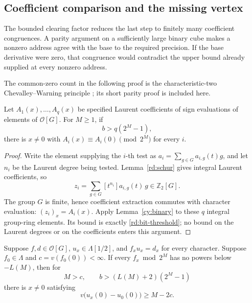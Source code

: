\subsection{Coefficient comparison and the missing vertex}
\label{rd:transfer-subsection}

The bounded clearing factor reduces the last step to finitely many
coefficient congruences.  A parity argument on a sufficiently large
binary cube makes a nonzero address agree with the base to the required
precision.  If the base derivative were zero, that congruence would
contradict the upper bound already supplied at every nonzero address.

The common-zero count in the following proof is the characteristic-two
Chevalley--Warning principle
\cite[Section~1, equation~(1)]{HeathBrownChevalleyWarning}; its short parity
proof is included here.

\begin{lemma}
\label{rd:bits}
Let \(A_1(x),\ldots,A_q(x)\) be specified Laurent
coefficients of sign evaluations of elements of
\(\mathcal O[G]\).  For \(M\ge1\), if
\begin{equation}
 b>q(2^M-1),
 \label{rd:bit-threshold}
\end{equation}
there is \(x\ne0\) with
\(A_i(x)\equiv A_i(0)\pmod{2^M}\) for every \(i\).
\end{lemma}

\begin{proof}
Write the element supplying the \(i\)-th test as
\(a_i=\sum_{g\in G}a_{i,g}(t)g\), and let \(n_i\) be the Laurent
degree being tested.  Lemma~\ref{rd:schur} gives integral Laurent
coefficients, so
\[
 z_i=\sum_{g\in G}[t^{n_i}]a_{i,g}(t)\,g\in\mathbb Z_2[G].
\]
The group \(G\) is finite, hence coefficient extraction commutes
with character evaluation: \((z_i)_x=A_i(x)\).  Apply
Lemma~\ref{cy:binary} to these \(q\) integral group-ring elements.
Its bound is exactly \eqref{rd:bit-threshold}; no bound on the
Laurent degrees or on the coefficients enters this argument.
\end{proof}

\begin{lemma}
\label{rd:binary-transfer}
Suppose \(f,d\in\mathcal O[G]\),
\(u_x\in\Lambda[1/2]\), and \(f_xu_x=d_x\)
for every character.  Suppose
\(f_0\in\Lambda\) and
\(c=v(f_0(0))<\infty\).
If every \(f_x\bmod2^M\) has no powers below
\(-L(M)\), then for
\[
 M>c,\qquad
 b>(L(M)+2)(2^M-1)
 \]
there is \(x\ne0\) satisfying
\begin{equation}
 v\bigl(u_x(0)-u_0(0)\bigr)\ge M-2c.
 \label{rd:binary-congruence}
\end{equation}
\end{lemma}

